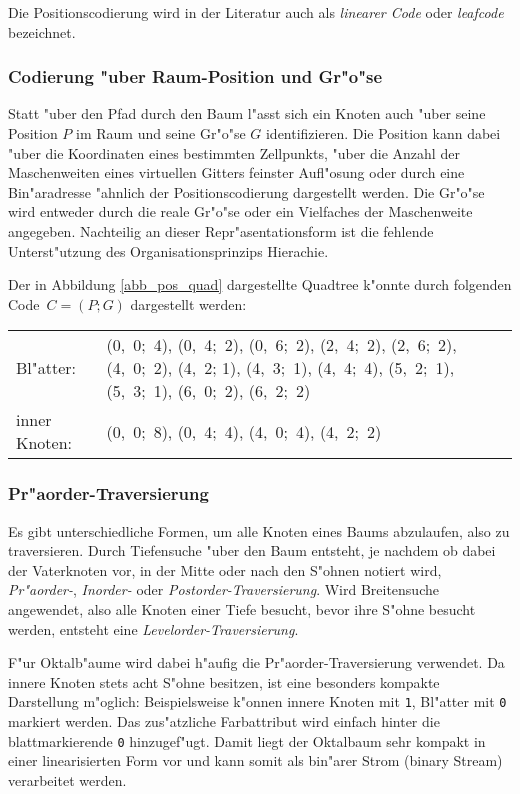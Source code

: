 Die Positionscodierung wird in der Literatur auch als \emph{linearer Code} 
oder \emph{leafcode} bezeichnet. 


\subsubsection{Codierung "uber Raum-Position und Gr"o"se}
Statt "uber den Pfad durch den Baum l"asst sich ein Knoten auch "uber seine 
Position $P$ im Raum und seine Gr"o"se $G$ identifizieren. Die Position 
kann dabei "uber die Koordinaten eines bestimmten Zellpunkts, "uber die Anzahl 
der Maschenweiten eines virtuellen Gitters feinster Aufl"osung oder durch 
eine Bin"aradresse "ahnlich der Positionscodierung dargestellt werden. 
Die Gr"o"se wird entweder durch die reale Gr"o"se oder ein Vielfaches der 
Maschenweite angegeben. 
Nachteilig an dieser Repr"asentationsform ist die fehlende Unterst"utzung des 
Organisationsprinzips Hierachie.

Der in Abbildung \ref{abb_pos_quad} dargestellte Quadtree k"onnte durch 
folgenden Code~$C=(P;G)$ dargestellt werden: 

\begin{tabularx}{\linewidth}{lX}
Bl"atter: & (0,~0;~4), (0,~4;~2), (0,~6;~2), (2,~4;~2), (2,~6;~2), (4,~0;~2), 
	    (4,~2; 1), (4,~3;~1), (4,~4;~4), (5,~2;~1), (5,~3;~1), (6,~0;~2), 
	    (6,~2;~2)\\
inner Knoten: & (0,~0;~8), (0,~4;~4), (4,~0;~4), (4,~2;~2)
\end{tabularx}

\subsubsection{Pr"aorder-Traversierung}
\label{pot_code}
Es gibt unterschiedliche Formen, um alle Knoten eines Baums abzulaufen, also 
zu traversieren. Durch Tiefensuche "uber den Baum entsteht, je nachdem ob 
dabei der Vaterknoten vor, in der Mitte oder nach den S"ohnen notiert wird, 
\emph{Pr"aorder-}, \emph{Inorder-} oder \emph{Postorder-Traversierung}. 
Wird Breitensuche angewendet, also alle Knoten einer Tiefe besucht, 
bevor ihre S"ohne besucht werden, entsteht eine 
\emph{Levelorder-Traversierung}.

F"ur Oktalb"aume wird dabei h"aufig die Pr"aorder-Traversierung verwendet. 
Da innere Knoten stets acht S"ohne besitzen, ist eine besonders kompakte 
Darstellung m"oglich: Beispielsweise k"onnen innere Knoten mit {\tt 1}, 
Bl"atter 
mit {\tt 0} markiert werden. 
Das zus"atzliche Farbattribut wird einfach hinter die blattmarkierende {\tt 0} 
hinzugef"ugt. Damit liegt der Oktalbaum sehr kompakt in einer linearisierten 
Form vor und kann somit als bin"arer Strom (binary Stream) verarbeitet werden. 

